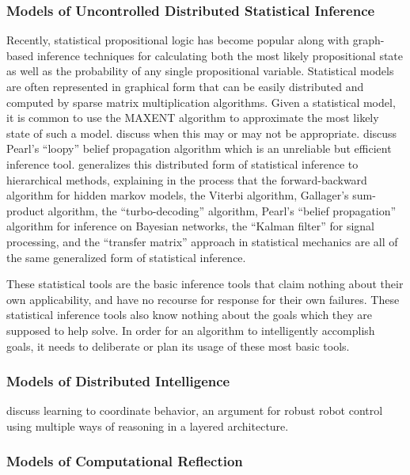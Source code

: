 \subsubsection{Models of Uncontrolled Distributed Statistical Inference}
Recently, statistical propositional logic has become popular along with graph-based inference techniques for calculating both the most likely propositional state as well as the probability of any single propositional variable.
Statistical models are often represented in graphical form that can be easily distributed and computed by sparse matrix multiplication algorithms.
Given a statistical model, it is common to use the MAXENT algorithm to approximate the most likely state of such a model.
\cite{jaynes:1982} discuss when this may or may not be appropriate.
\cite{murphy:1999} discuss Pearl's ``loopy'' belief propagation algorithm which is an unreliable but efficient inference tool.
\cite{yedidia:2005} generalizes this distributed form of statistical inference to hierarchical methods, explaining in the process that the forward-backward algorithm for hidden markov models, the Viterbi algorithm, Gallager's sum-product algorithm, the ``turbo-decoding'' algorithm, Pearl's ``belief propagation'' algorithm for inference on Bayesian networks, the ``Kalman filter'' for signal processing, and the ``transfer matrix'' approach in statistical mechanics are all of the same generalized form of statistical inference.

These statistical tools are the basic inference tools that claim nothing about their own applicability, and have no recourse for response for their own failures.
These statistical inference tools also know nothing about the goals which they are supposed to help solve.
In order for an algorithm to intelligently accomplish goals, it needs to deliberate or plan its usage of these most basic tools.

\subsubsection{Models of Distributed Intelligence}

\cite{maes:1990} discuss learning to coordinate behavior, an argument for robust robot control using multiple ways of reasoning in a layered architecture.

\subsubsection{Models of Computational Reflection}

